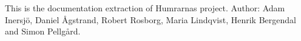 This is the documentation extraction of Humrarnas project. Author\-: Adam Inersjö, Daniel Ågstrand, Robert Rosborg, Maria Lindqvist, Henrik Bergendal and Simon Pellgård. 